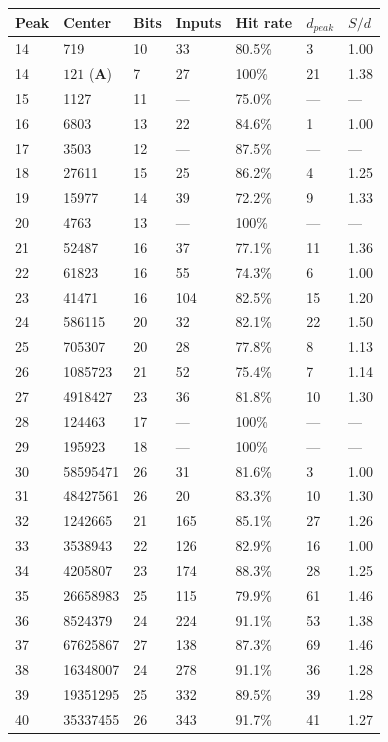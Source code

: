 \documentclass[12pt,a4paper]{article}
\theoremstyle{remark}
\begin{document}
\begin{longtable}{lllllll}
\toprule
\textbf{Peak} & \textbf{Center} & \textbf{Bits} & \textbf{Inputs} & \textbf{Hit rate} & $d_{peak}$ & $S/d$ \\
\midrule
14 & 719 & 10 & 33 & 80.5\% & 3 & 1.00 \\
14 & $121$ (\textbf{A}) & 7 & 27 & 100\% & 21 & 1.38 \\
15 & 1127 & 11 & --- & 75.0\% & --- & --- \\
16 & 6803 & 13 & 22 & 84.6\% & 1 & 1.00 \\
17 & 3503 & 12 & --- & 87.5\% & --- & --- \\
18 & 27611 & 15 & 25 & 86.2\% & 4 & 1.25 \\
19 & 15977 & 14 & 39 & 72.2\% & 9 & 1.33 \\
20 & 4763 & 13 & --- & 100\% & --- & --- \\
21 & 52487 & 16 & 37 & 77.1\% & 11 & 1.36 \\
22 & 61823 & 16 & 55 & 74.3\% & 6 & 1.00 \\
23 & 41471 & 16 & 104 & 82.5\% & 15 & 1.20 \\
24 & 586115 & 20 & 32 & 82.1\% & 22 & 1.50 \\
25 & 705307 & 20 & 28 & 77.8\% & 8 & 1.13 \\
26 & 1085723 & 21 & 52 & 75.4\% & 7 & 1.14 \\
27 & 4918427 & 23 & 36 & 81.8\% & 10 & 1.30 \\
28 & 124463 & 17 & --- & 100\% & --- & --- \\
29 & 195923 & 18 & --- & 100\% & --- & --- \\
30 & 58595471 & 26 & 31 & 81.6\% & 3 & 1.00 \\
31 & 48427561 & 26 & 20 & 83.3\% & 10 & 1.30 \\
32 & 1242665 & 21 & 165 & 85.1\% & 27 & 1.26 \\
33 & 3538943 & 22 & 126 & 82.9\% & 16 & 1.00 \\
34 & 4205807 & 23 & 174 & 88.3\% & 28 & 1.25 \\
35 & 26658983 & 25 & 115 & 79.9\% & 61 & 1.46 \\
36 & 8524379 & 24 & 224 & 91.1\% & 53 & 1.38 \\
37 & 67625867 & 27 & 138 & 87.3\% & 69 & 1.46 \\
38 & 16348007 & 24 & 278 & 91.1\% & 36 & 1.28 \\
39 & 19351295 & 25 & 332 & 89.5\% & 39 & 1.28 \\
40 & 35337455 & 26 & 343 & 91.7\% & 41 & 1.27 \\

\end{longtable}
\end{document}
